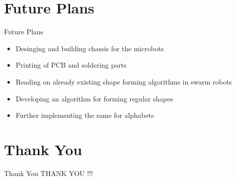 \documentclass[10pt, a4paper]{beamer}
\begin{document}
\section{Future Plans}
\begin{frame}{Future Plans}
	\begin{itemize}
		\item Desinging and building chassis for the microbots
		\item Printing of PCB and soldering parts
		\item Reading on already existing shape forming algorithms in swarm robots
		\item Developing an algorithm for forming regular shapes
		\item Further implementing the same for alphabets
	\end{itemize}
\end{frame}


\section{Thank You}
\begin{frame}{Thank You}
	\centering THANK YOU !!!
\end{frame}
\end{document}

